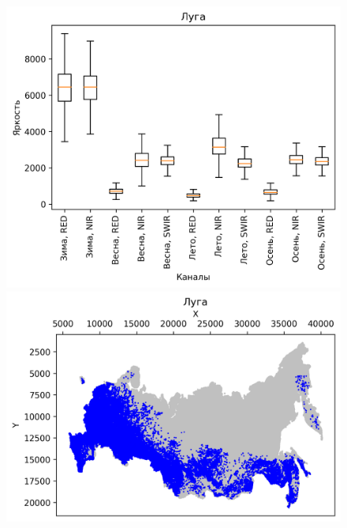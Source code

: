 \documentclass[14pt, a4paper, oneside]{extarticle}
\begin{document}
\begin{figure}[H]
    \centering
    \includegraphics[]{class-8-boxplot}
    \includegraphics[]{class-8-map}
\end{figure}
\end{document}
